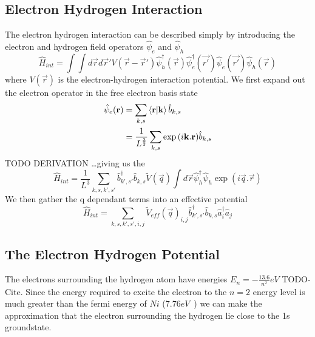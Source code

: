 \subsection{Electron Hydrogen Interaction}
The electron hydrogen interaction can
be described simply by introducing
the electron and hydrogen field
operators \(\hat{\psi}_e\) and
\(\hat{\psi}_h\)~\cite{nazarov_danon_2013}
\begin{equation}
  \hat{H}_{int} = \int\int{d\vec{r} d\vec{r}'
    V(\vec{r}-\vec{r}')
    \hat{\psi}^\dagger_h(\vec{r})
    \hat{\psi}^\dagger_e(\vec{r'})
    \hat{\psi}_e(\vec{r'})
    \hat{\psi}_h(\vec{r})}
\end{equation}
where \(V(\vec{r})\) is
the electron-hydrogen
interaction potential.
We first expand out the
electron operator in
the free electron basis state
\begin{align}
  \hat{\psi}_e(\mathbf{r}) & = \sum_{k, s}
  \braket{\mathbf{r}|\mathbf{k}}
  \hat{b}_{k, s}                                      \\
                        & = \frac{1}{L^{\frac{3}{2}}}
  \sum_{k, s} \exp{(i\mathbf{k}.\mathbf{r})}
  \hat{b}_{k, s}
\end{align}
TODO DERIVATION
\ldots giving us the
\begin{equation}
  \hat{H}_{int} = \frac{1}{L^3}
  \sum_{k,s,k',s'}
  \hat{b}^\dagger_{k',s'}\hat{b}_{k,s}
  \tilde{V}(\vec{q})\int{d\vec{r}
  \hat{\psi}_h^{\dagger}\hat{\psi}_h
  \exp(i\vec{q}.\vec{r})}
\end{equation}
We then gather the q dependant terms into
an effective potential
\begin{equation}
  \hat{H}_{int} = \sum_{k,s,k',s',i,j}
  {\tilde{V}_{eff}(\vec{q})}_{i,j}
  \hat{b}^\dagger_{k',s'}\hat{b}_{k,s}
  \hat{a}^\dagger_{i}\hat{a}_{j}
  \label{eqn:interaction hamiltonian in k}
\end{equation}

\subsection{The Electron Hydrogen Potential}

The electrons surrounding the hydrogen
atom have energies \(E_n = -\frac{13.6}{n^2} eV\) TODO-Cite.
Since the energy required to excite the electron
to the \(n=2\) energy level is much greater
than the fermi energy of \(Ni\)
(\(7.76eV\)~\cite{PhysRev.131.2469}) we can
make the approximation that the electron surrounding
the hydrogen lie close to the 1s groundstate.

